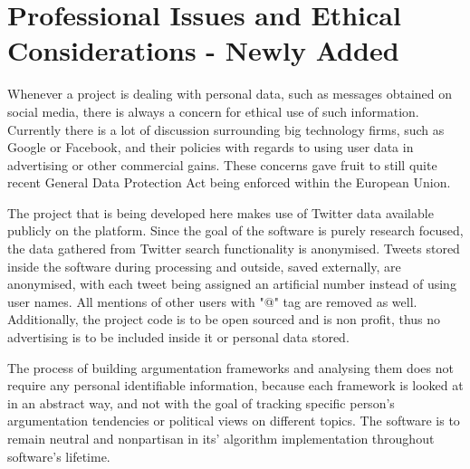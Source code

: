 \section{Professional Issues and Ethical Considerations - Newly Added}
    Whenever a project is dealing with personal data, such as messages obtained on social media, there is always a concern for ethical use of such information. Currently there is a lot of discussion surrounding big technology firms, such as Google or Facebook, and their policies with regards to using user data in advertising or other commercial gains. These concerns gave fruit to still quite recent General Data Protection Act being enforced within the European Union.
    
    The project that is being developed here makes use of Twitter data available publicly on the platform. Since the goal of the software is purely research focused, the data gathered from Twitter search functionality is anonymised. Tweets stored inside the software during processing and outside, saved externally, are anonymised, with each tweet being assigned an artificial number instead of using user names. All mentions of other users with "@" tag are removed as well. Additionally, the project code is to be open sourced and is non profit, thus no advertising is to be included inside it or personal data stored.
    
    The process of building argumentation frameworks and analysing them does not require any personal identifiable information, because each framework is looked at in an abstract way, and not with the goal of tracking specific person's argumentation tendencies or political views on different topics. The software is to remain neutral and nonpartisan in its' algorithm implementation throughout software's lifetime.